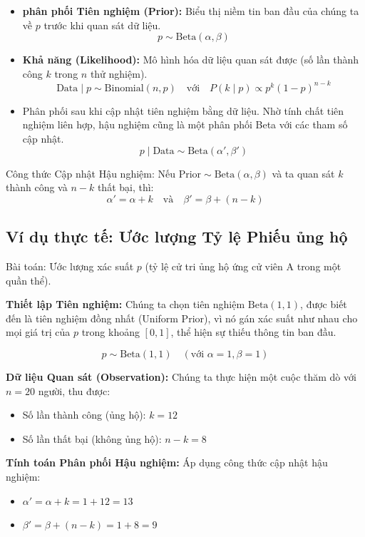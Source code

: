 \begin{itemize}
    \item \textbf{phân phối Tiên nghiệm (Prior):} Biểu thị niềm tin ban đầu của chúng ta về $p$ trước khi quan sát dữ liệu.
    \[
    p \sim \text{Beta}(\alpha, \beta)
    \]
    \item \textbf{Khả năng (Likelihood):} Mô hình hóa dữ liệu quan sát được (số lần thành công $k$ trong $n$ thử nghiệm).
    \[
    \text{Data} \mid p \sim \text{Binomial}(n, p) \quad \text{với} \quad P(k \mid p) \propto p^k (1-p)^{n-k}
    \]
    \item {} Phân phối sau khi cập nhật tiên nghiệm bằng dữ liệu. Nhờ tính chất tiên nghiệm liên hợp, hậu nghiệm cũng là một phân phối Beta với các tham số cập nhật.
    \[
    p \mid \text{Data} \sim \text{Beta}(\alpha', \beta')
    \]
\end{itemize}

Công thức Cập nhật Hậu nghiệm:
Nếu $\text{Prior} \sim \text{Beta}(\alpha, \beta)$ và ta quan sát $k$ thành công và $n-k$ thất bại, thì:
\[
\alpha' = \alpha + k \quad \text{và} \quad \beta' = \beta + (n-k)
\]

\subsection{Ví dụ thực tế: Ước lượng Tỷ lệ Phiếu ủng hộ}

Bài toán: Ước lượng xác suất $p$ (tỷ lệ cử tri ủng hộ ứng cử viên A trong một quần thể).

\textbf{Thiết lập Tiên nghiệm:}
Chúng ta chọn tiên nghiệm $\text{Beta}(1, 1)$, được biết đến là tiên nghiệm đồng nhất (Uniform Prior), vì nó gán xác suất như nhau cho mọi giá trị của $p$ trong khoảng $[0, 1]$, thể hiện sự thiếu thông tin ban đầu.

\[
p \sim \text{Beta}(1, 1) \quad (\text{với } \alpha=1, \beta=1)
\]

\textbf{Dữ liệu Quan sát (Observation):}
Chúng ta thực hiện một cuộc thăm dò với $n=20$ người, thu được:
\begin{itemize}
    \item Số lần thành công (ủng hộ): $k = 12$
    \item Số lần thất bại (không ủng hộ): $n-k = 8$
\end{itemize}
\newpage
\textbf{Tính toán Phân phối Hậu nghiệm:}
Áp dụng công thức cập nhật hậu nghiệm:
\begin{itemize}
    \item $\alpha' = \alpha + k = 1 + 12 = 13$
    \item $\beta' = \beta + (n-k) = 1 + 8 = 9$
\end{itemize}

